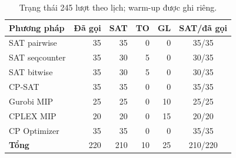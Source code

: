 \begin{table}[htbp]
\caption{Trạng thái 245 lượt theo lịch; warm-up được ghi riêng.}\label{tab:status}
\centering\small
\begin{tabular}{lrrrrc}
\toprule
Phương pháp & Đã gọi & SAT & TO & GL & SAT/đã gọi \\
\midrule
SAT pairwise & 35 & 35 & 0 & 0 & 35/35 \\
SAT seqcounter & 35 & 30 & 5 & 0 & 30/35 \\
SAT bitwise & 35 & 30 & 5 & 0 & 30/35 \\
CP-SAT & 35 & 35 & 0 & 0 & 35/35 \\
Gurobi MIP & 25 & 25 & 0 & 10 & 25/25 \\
CPLEX MIP & 20 & 20 & 0 & 15 & 20/20 \\
CP Optimizer & 35 & 35 & 0 & 0 & 35/35 \\
\textbf{Tổng} & 220 & 210 & 10 & 25 & 210/220 \\
\bottomrule
\end{tabular}
\end{table}
